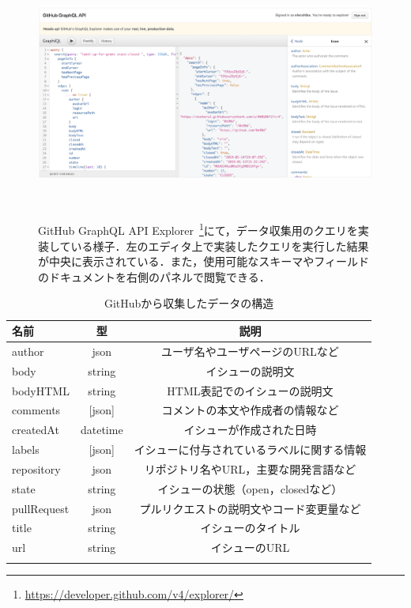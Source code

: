 \begin{figure}[tb]
    \centering
    \includegraphics[width=1.0\columnwidth]{GitHub_api_explorer.png}
    \caption{GitHub GraphQL API Explorer~\footnote{\url{https://developer.github.com/v4/explorer/}}にて，データ収集用のクエリを実装している様子．左のエディタ上で実装したクエリを実行した結果が中央に表示されている．また，使用可能なスキーマやフィールドのドキュメントを右側のパネルで閲覧できる．}~\label{fig:GitHub_api_explorer}
\end{figure}


\begin{table}[t]

  \centering
  \caption{GitHubから収集したデータの構造}
  \label{table:format_collected_GH_data}
    
  \begin{tabular}{l | c | c } \Xhline{3\arrayrulewidth}
      名前 & 型 & 説明 \\ \hline \hline
      author & json & ユーザ名やユーザページのURLなど\\
      body & string & イシューの説明文  \\
      bodyHTML & string & HTML表記でのイシューの説明文 \\
      comments & [json] & コメントの本文や作成者の情報など \\
      createdAt & datetime & イシューが作成された日時 \\
      labels & [json] & イシューに付与されているラベルに関する情報 \\
      repository & json & リポジトリ名やURL，主要な開発言語など\\  
      state & string & イシューの状態（open，closedなど） \\
      pullRequest & json & プルリクエストの説明文やコード変更量など \\
      title & string & イシューのタイトル \\
      url & string & イシューのURL \\
      
      \Xhline{3\arrayrulewidth}
  \end{tabular}
\end{table}

